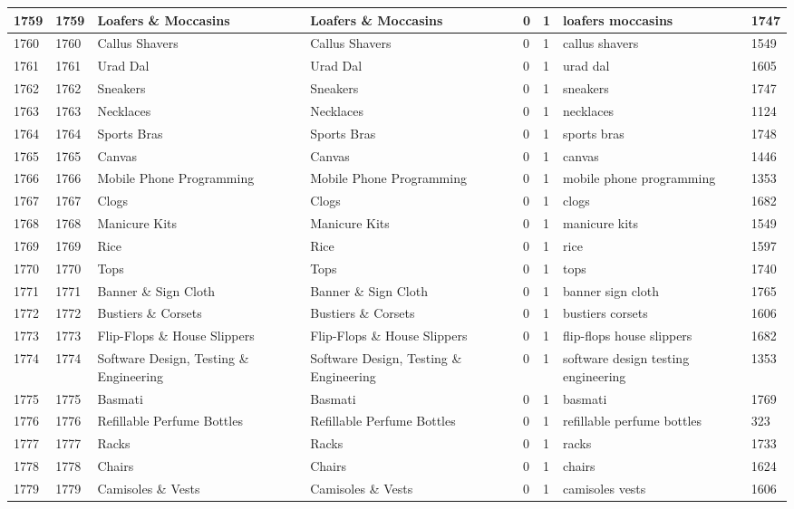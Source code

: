 \begin{longtable}{|l|l|l|l|l|l|l|l|}
1759 & 1759 & Loafers \& Moccasins & Loafers \& Moccasins & 0 & 1 & loafers moccasins & 1747 \\ \hline 
1760 & 1760 & Callus Shavers & Callus Shavers & 0 & 1 & callus shavers & 1549 \\ \hline 
1761 & 1761 & Urad Dal & Urad Dal & 0 & 1 & urad dal & 1605 \\ \hline 
1762 & 1762 & Sneakers & Sneakers & 0 & 1 & sneakers & 1747 \\ \hline 
1763 & 1763 & Necklaces & Necklaces & 0 & 1 & necklaces & 1124 \\ \hline 
1764 & 1764 & Sports Bras & Sports Bras & 0 & 1 & sports bras & 1748 \\ \hline 
1765 & 1765 & Canvas & Canvas & 0 & 1 & canvas & 1446 \\ \hline 
1766 & 1766 & Mobile Phone Programming & Mobile Phone Programming & 0 & 1 & mobile phone programming & 1353 \\ \hline 
1767 & 1767 & Clogs & Clogs & 0 & 1 & clogs & 1682 \\ \hline 
1768 & 1768 & Manicure Kits & Manicure Kits & 0 & 1 & manicure kits & 1549 \\ \hline 
1769 & 1769 & Rice & Rice & 0 & 1 & rice & 1597 \\ \hline 
1770 & 1770 & Tops & Tops & 0 & 1 & tops & 1740 \\ \hline 
1771 & 1771 & Banner \& Sign Cloth & Banner \& Sign Cloth & 0 & 1 & banner sign cloth & 1765 \\ \hline 
1772 & 1772 & Bustiers \& Corsets & Bustiers \& Corsets & 0 & 1 & bustiers corsets & 1606 \\ \hline 
1773 & 1773 & Flip-Flops \& House Slippers & Flip-Flops \& House Slippers & 0 & 1 & flip-flops house slippers & 1682 \\ \hline 
1774 & 1774 & Software Design, Testing \& Engineering & Software Design, Testing \& Engineering & 0 & 1 & software design testing engineering & 1353 \\ \hline 
1775 & 1775 & Basmati & Basmati & 0 & 1 & basmati & 1769 \\ \hline 
1776 & 1776 & Refillable Perfume Bottles & Refillable Perfume Bottles & 0 & 1 & refillable perfume bottles & 323 \\ \hline 
1777 & 1777 & Racks & Racks & 0 & 1 & racks & 1733 \\ \hline 
1778 & 1778 & Chairs & Chairs & 0 & 1 & chairs & 1624 \\ \hline 
1779 & 1779 & Camisoles \& Vests & Camisoles \& Vests & 0 & 1 & camisoles vests & 1606 \\ \hline 

\end{longtable}
